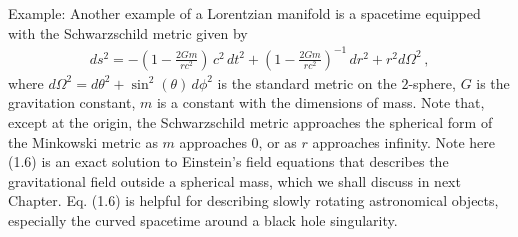 \documentclass[11pt, onesided]{book}
\theoremstyle{break}
\theoremstyle{break}
\newcommand{\example}{\color{green}Example: \color{black}}
\begin{document}
\example Another example of a Lorentzian manifold is a spacetime equipped with the Schwarzschild metric given by
\begin{align}
ds^2 = -\left( 1 - \frac{2Gm}{rc^2}\right)\, c^2 \, dt^2 + \left( 1 - \frac{2Gm}{rc^2}\right)^{-1} \, dr^2 + r^2 d\Omega^2\, ,
\end{align}
where $d\Omega^2 = d\theta^2+\sin^2(\theta) \,d\phi^2 $ is the standard metric on the $2$-sphere, $G$ is the gravitation constant, $m$ is a constant with the dimensions of mass. Note that, except at the origin, the Schwarzschild metric approaches the spherical form of the Minkowski metric as $m$ approaches $0$, or as $r$ approaches infinity. Note here (1.6) is an exact solution to Einstein's field equations that describes the gravitational field outside a spherical mass, which we shall discuss in next Chapter. Eq. (1.6) is helpful for describing slowly rotating astronomical objects, especially the curved spacetime around a black hole singularity. 

\newpage
\end{document}
